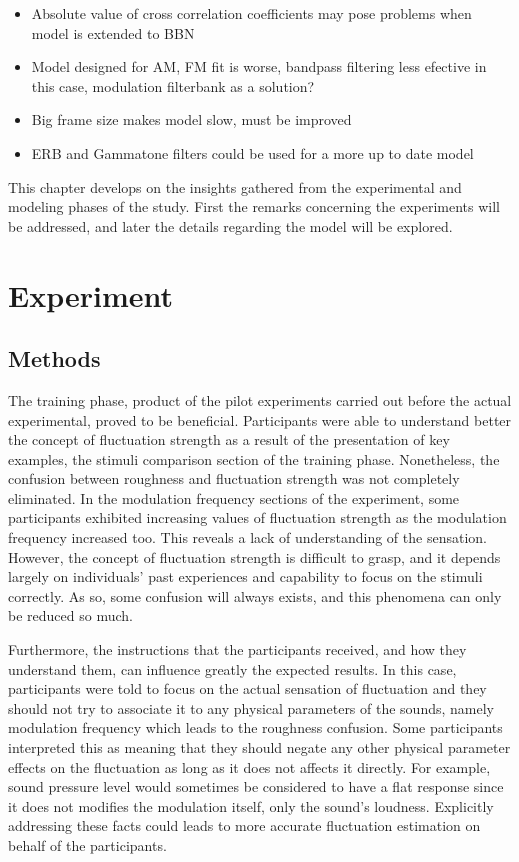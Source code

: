 \documentclass[../main.tex]{subfiles}
\begin{document}
\begin{itemize}
  \begin{itemize}
    \item Absolute value of cross correlation coefficients may pose problems
      when model is extended to BBN
    \item Model designed for AM, FM fit is worse, bandpass filtering less
      efective in this case, modulation filterbank as a solution?
    \item Big frame size makes model slow, must be improved
    \item ERB and Gammatone filters could be used for a more up to date model
  \end{itemize}
\end{itemize}

\fi

This chapter develops on the insights gathered from the experimental and
modeling phases of the study. First the remarks concerning the experiments will
be addressed, and later the details regarding the model will be explored.

\section{Experiment}

\subsection{Methods}

The training phase, product of the pilot experiments carried out before the
actual experimental, proved to be beneficial. Participants were able to
understand better the concept of fluctuation strength as a result of the
presentation of key examples, the stimuli comparison section of the training
phase. Nonetheless, the confusion between roughness and fluctuation strength was
not completely eliminated. In the modulation frequency sections of the
experiment, some participants exhibited increasing values of fluctuation
strength as the modulation frequency increased too. This reveals a lack of
understanding of the sensation. However, the concept of fluctuation strength is
difficult to grasp, and it depends largely on individuals' past experiences and
capability to focus on the stimuli correctly. As so, some confusion will always
exists, and this phenomena can only be reduced so much.

Furthermore, the instructions that the participants received, and how they
understand them, can influence greatly the expected results. In this case,
participants were told to focus on the actual sensation of fluctuation and they
should not try to associate it to any physical parameters of the sounds, namely
modulation frequency which leads to the roughness confusion. Some participants
interpreted this as meaning that they should negate any other physical parameter
effects on the fluctuation as long as it does not affects it directly. For
example, sound pressure level would sometimes be considered to have a flat
response since it does not modifies the modulation itself, only the sound's
loudness. Explicitly addressing these facts could leads to more accurate
fluctuation estimation on behalf of the participants.
\end{document}
